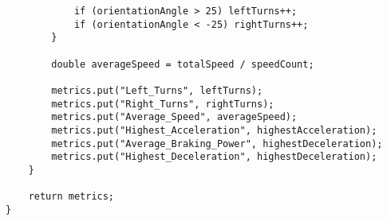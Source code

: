 \begin{verbatim}
            if (orientationAngle > 25) leftTurns++;
            if (orientationAngle < -25) rightTurns++;
        }

        double averageSpeed = totalSpeed / speedCount;

        metrics.put("Left_Turns", leftTurns);
        metrics.put("Right_Turns", rightTurns);
        metrics.put("Average_Speed", averageSpeed);
        metrics.put("Highest_Acceleration", highestAcceleration);
        metrics.put("Average_Braking_Power", highestDeceleration);
        metrics.put("Highest_Deceleration", highestDeceleration);
    }

    return metrics;
}
\end{verbatim}
